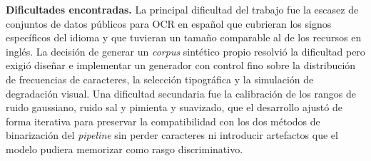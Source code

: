 \noindent\textbf{Dificultades encontradas.} La principal dificultad del trabajo fue la escasez de conjuntos de datos públicos para OCR en español que cubrieran los signos específicos del idioma y que tuvieran un tamaño comparable al de los recursos en inglés. La decisión de generar un \textit{corpus} sintético propio resolvió la dificultad pero exigió diseñar e implementar un generador con control fino sobre la distribución de frecuencias de caracteres, la selección tipográfica y la simulación de degradación visual. Una dificultad secundaria fue la calibración de los rangos de ruido gaussiano, ruido sal y pimienta y suavizado, que el desarrollo ajustó de forma iterativa para preservar la compatibilidad con los dos métodos de binarización del \textit{pipeline} sin perder caracteres ni introducir artefactos que el modelo pudiera memorizar como rasgo discriminativo.
